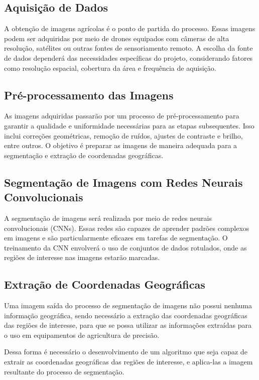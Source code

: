 \documentclass[conference]{IEEEtran}
\begin{document}
\subsection{Aquisição de Dados}

A obtenção de imagens agrícolas é o ponto de partida do processo. 
Essas imagens podem ser adquiridas por meio de drones equipados com câmeras de alta resolução, 
satélites ou outras fontes de sensoriamento remoto. A escolha da fonte de dados dependerá das 
necessidades específicas do projeto, considerando fatores como resolução espacial, 
cobertura da área e frequência de aquisição.

\subsection{Pré-processamento das Imagens}
As imagens adquiridas passarão por um processo de pré-processamento para garantir a qualidade 
e uniformidade necessárias para as etapas subsequentes. Isso inclui correções geométricas, 
remoção de ruídos, ajustes de contraste e brilho, entre outros. O objetivo é preparar as 
imagens de maneira adequada para a segmentação e extração de coordenadas geográficas.

\subsection{Segmentação de Imagens com Redes Neurais Convolucionais}
A segmentação de imagens será realizada por meio de redes neurais convolucionais (CNNs). 
Essas redes são capazes de aprender padrões complexos em imagens e são particularmente eficazes 
em tarefas de segmentação. O treinamento da CNN envolverá o uso de conjuntos de dados rotulados, 
onde as regiões de interesse nas imagens estarão marcadas.

\subsection{Extração de Coordenadas Geográficas}
Uma imagem saída do processo de segmentação de imagens não possui nenhuma informação geográfica, 
sendo necessário a extração das coordenadas geográficas das regiões de interesse, para que se possa 
utilizar as informações extraídas para o uso em equipamentos de agricultura de precisão.

Dessa forma é necessário o desenvolvimento de um algoritmo que seja capaz de extrair as coordenadas 
geográficas das regiões de interesse, e aplica-las a imagem resultante do processo de segmentação.
\end{document}
